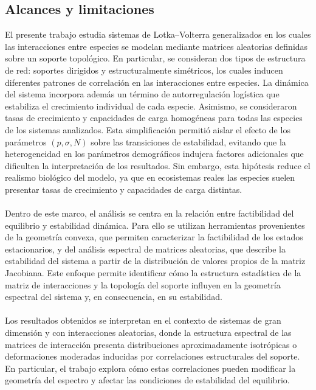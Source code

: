 \subsection{Alcances y limitaciones}

El presente trabajo estudia sistemas de Lotka–Volterra generalizados en los cuales las interacciones entre especies se modelan mediante matrices aleatorias definidas sobre un soporte topológico. En particular, se consideran dos tipos de estructura de red: soportes dirigidos y estructuralmente simétricos, los cuales inducen diferentes patrones de correlación en las interacciones entre especies. La dinámica del sistema incorpora además un término de autorregulación logística que estabiliza el crecimiento individual de cada especie. 
\newpage
Asimismo, se consideraron tasas de crecimiento y capacidades de carga homogéneas para todas las especies de los sistemas analizados. Esta simplificación permitió aislar el efecto de los parámetros $(p,\sigma,N)$ sobre las transiciones de estabilidad, evitando que la heterogeneidad en los parámetros demográficos indujera factores adicionales que dificulten la interpretación de los resultados. Sin embargo, esta hipótesis reduce el realismo biológico del modelo, ya que en ecosistemas reales las especies suelen presentar tasas de crecimiento y capacidades de carga distintas.\\
\\
Dentro de este marco, el análisis se centra en la relación entre factibilidad del equilibrio y estabilidad dinámica. Para ello se utilizan herramientas provenientes de la geometría convexa, que permiten caracterizar la factibilidad de los estados estacionarios, y del análisis espectral de matrices aleatorias, que describe la estabilidad del sistema a partir de la distribución de valores propios de la matriz Jacobiana. Este enfoque permite identificar cómo la estructura estadística de la matriz de interacciones y la topología del soporte influyen en la geometría espectral del sistema y, en consecuencia, en su estabilidad.
\\
\\
Los resultados obtenidos se interpretan en el contexto de sistemas de gran dimensión y con interacciones aleatorias, donde la estructura espectral de las matrices de interacción presenta distribuciones aproximadamente isotrópicas o deformaciones moderadas inducidas por correlaciones estructurales del soporte. En particular, el trabajo explora cómo estas correlaciones pueden modificar la geometría del espectro y afectar las condiciones de estabilidad del equilibrio.
